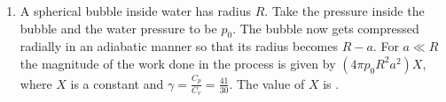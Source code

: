 
\begin{enumerate}
    \item A spherical bubble inside water has radius \( R \). Take the pressure inside the bubble and the water pressure to be \( p_0 \). The bubble now gets compressed radially in an adiabatic manner so that its radius becomes \( R - a \). For \( a \ll R \) the magnitude of the work done in the process is given by \( (4\pi p_0 R^2 a^2)X \), where \( X \) is a constant and \( \gamma = \frac{C_p}{C_v} = \frac{41}{30} \). The value of \( X \) is \underline{\hspace{3cm}}.
\end{enumerate}
